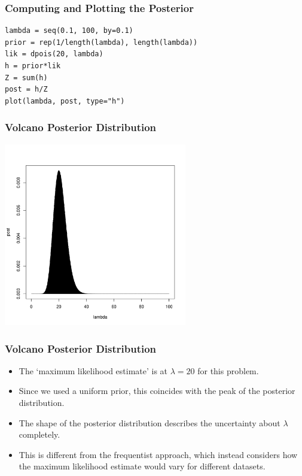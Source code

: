 \documentclass{beamer}
\begin{document}
\begin{frame}[fragile]
\frametitle{Computing and Plotting the Posterior}
\begin{verbatim}
lambda = seq(0.1, 100, by=0.1)
prior = rep(1/length(lambda), length(lambda))
lik = dpois(20, lambda)
h = prior*lik
Z = sum(h)
post = h/Z
plot(lambda, post, type="h")
\end{verbatim}

\end{frame}



\begin{frame}[fragile]
\frametitle{Volcano Posterior Distribution}

\centering
\includegraphics[width=0.6\textwidth]{images/volcano.pdf}

\end{frame}


\begin{frame}[fragile]
\frametitle{Volcano Posterior Distribution}

\begin{itemize}
\item The `maximum likelihood estimate' is at $\lambda=20$ for this problem.\pause
\item Since we used a uniform prior, this coincides with the peak of the
posterior distribution.\pause
\item The shape of the posterior distribution describes the uncertainty
about $\lambda$ completely.\pause
\item This is different from the frequentist approach, which
instead considers how
the maximum likelihood estimate would vary for different datasets.
\end{itemize}

\end{frame}
\end{document}
